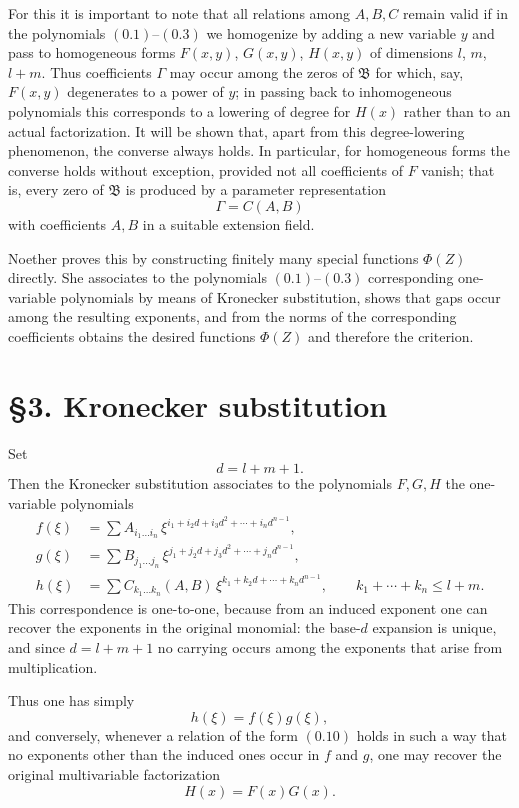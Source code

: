 \documentclass[11pt]{article}
\begin{document}
For this it is important to note that all relations among $A,B,C$ remain valid if in the polynomials \((0.1)\)--\((0.3)\) we homogenize by adding a new variable $y$ and pass to homogeneous forms $F(x,y)$, $G(x,y)$, $H(x,y)$ of dimensions $l$, $m$, $l+m$. Thus coefficients $\Gamma$ may occur among the zeros of $\mathfrak B$ for which, say, $F(x,y)$ degenerates to a power of $y$; in passing back to inhomogeneous polynomials this corresponds to a lowering of degree for $H(x)$ rather than to an actual factorization. It will be shown that, apart from this degree-lowering phenomenon, the converse always holds. In particular, for homogeneous forms the converse holds without exception, provided not all coefficients of $F$ vanish; that is, every zero of $\mathfrak B$ is produced by a parameter representation
\[
\Gamma=C(A,B)
\]
with coefficients $A,B$ in a suitable extension field.

Noether proves this by constructing finitely many special functions $\Phi(Z)$ directly. She associates to the polynomials \((0.1)\)--\((0.3)\) corresponding one-variable polynomials by means of Kronecker substitution, shows that gaps occur among the resulting exponents, and from the norms of the corresponding coefficients obtains the desired functions $\Phi(Z)$ and therefore the criterion.

\section*{\S 3. Kronecker substitution}

Set
\[
d=l+m+1.
\tag{0.6}
\]
Then the Kronecker substitution associates to the polynomials $F,G,H$ the one-variable polynomials
\begin{align}
f(\xi) &= \sum A_{i_1\dots i_n}\,\xi^{i_1+i_2d+i_3d^2+\cdots+i_nd^{n-1}}, \tag{0.7}\\
g(\xi) &= \sum B_{j_1\dots j_n}\,\xi^{j_1+j_2d+j_3d^2+\cdots+j_nd^{n-1}}, \tag{0.8}\\
h(\xi) &= \sum C_{k_1\dots k_n}(A,B)\,\xi^{k_1+k_2d+\cdots+k_nd^{n-1}},
\qquad k_1+\cdots+k_n\le l+m. \tag{0.9}
\end{align}
This correspondence is one-to-one, because from an induced exponent one can recover the exponents in the original monomial: the base-$d$ expansion is unique, and since $d=l+m+1$ no carrying occurs among the exponents that arise from multiplication.

Thus one has simply
\[
h(\xi)=f(\xi)g(\xi),
\tag{0.10}
\]
and conversely, whenever a relation of the form \((0.10)\) holds in such a way that no exponents other than the induced ones occur in $f$ and $g$, one may recover the original multivariable factorization
\[
H(x)=F(x)G(x).
\tag{0.11}
\]
\end{document}
